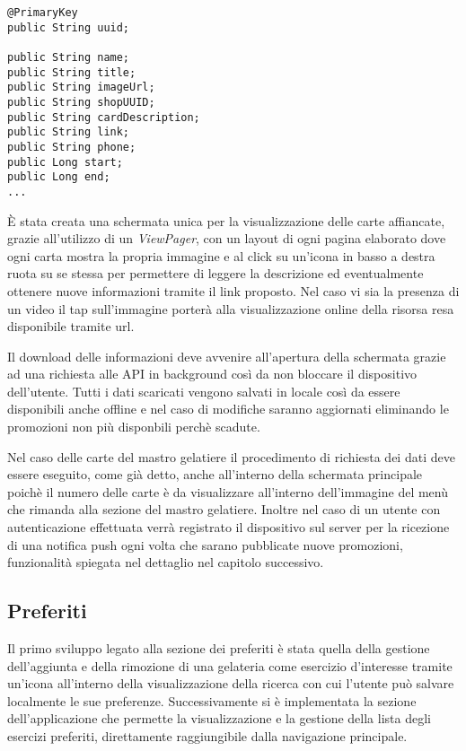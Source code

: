 \begin{lstlisting}
@PrimaryKey
public String uuid;

public String name;
public String title;
public String imageUrl; 
public String shopUUID; 
public String cardDescription; 
public String link;
public String phone; 
public Long start; 
public Long end;
...
\end{lstlisting}
È stata creata una schermata unica per la visualizzazione delle carte
affiancate, grazie all'utilizzo di un \emph{ViewPager}, con un layout
di ogni pagina elaborato dove ogni carta mostra la propria immagine
e al click su un'icona in basso a destra ruota su se stessa per permettere
di leggere la descrizione ed eventualmente ottenere nuove informazioni
tramite il link proposto. Nel caso vi sia la presenza di un video
il tap sull'immagine porterà alla visualizzazione online della risorsa
resa disponibile tramite url.

Il download delle informazioni deve avvenire all'apertura della schermata
grazie ad una richiesta alle API in background così da non bloccare
il dispositivo dell'utente. Tutti i dati scaricati vengono salvati
in locale così da essere disponibili anche offline e nel caso di modifiche
saranno aggiornati eliminando le promozioni non più disponbili perchè
scadute.

Nel caso delle carte del mastro gelatiere il procedimento di richiesta
dei dati deve essere eseguito, come già detto, anche all'interno della
schermata principale poichè il numero delle carte è da visualizzare
all'interno dell'immagine del menù che rimanda alla sezione del mastro
gelatiere. Inoltre nel caso di un utente con autenticazione effettuata
verrà registrato il dispositivo sul server per la ricezione di una
notifica push ogni volta che sarano pubblicate nuove promozioni, funzionalità
spiegata nel dettaglio nel capitolo successivo.

\subsection{Preferiti}

Il primo sviluppo legato alla sezione dei preferiti è stata quella
della gestione dell'aggiunta e della rimozione di una gelateria come
esercizio d'interesse tramite un'icona all'interno della visualizzazione
della ricerca con cui l'utente può salvare localmente le sue preferenze.
Successivamente si è implementata la sezione dell'applicazione che
permette la visualizzazione e la gestione della lista degli esercizi
preferiti, direttamente raggiungibile dalla navigazione principale.

